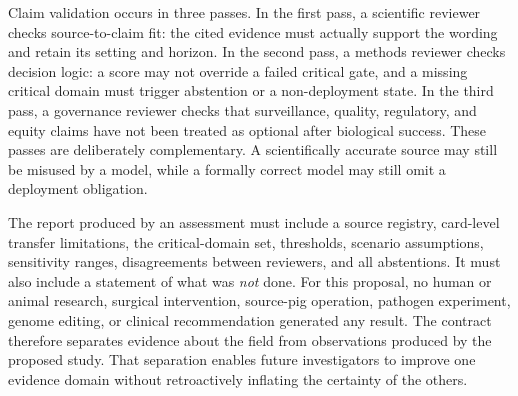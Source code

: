 \documentclass[conference]{IEEEtran}
\begin{document}
Claim validation occurs in three passes. In the first pass, a scientific reviewer checks source-to-claim fit: the cited evidence must actually support the wording and retain its setting and horizon. In the second pass, a methods reviewer checks decision logic: a score may not override a failed critical gate, and a missing critical domain must trigger abstention or a non-deployment state. In the third pass, a governance reviewer checks that surveillance, quality, regulatory, and equity claims have not been treated as optional after biological success. These passes are deliberately complementary. A scientifically accurate source may still be misused by a model, while a formally correct model may still omit a deployment obligation.

The report produced by an assessment must include a source registry, card-level transfer limitations, the critical-domain set, thresholds, scenario assumptions, sensitivity ranges, disagreements between reviewers, and all abstentions. It must also include a statement of what was \emph{not} done. For this proposal, no human or animal research, surgical intervention, source-pig operation, pathogen experiment, genome editing, or clinical recommendation generated any result. The contract therefore separates evidence about the field from observations produced by the proposed study. That separation enables future investigators to improve one evidence domain without retroactively inflating the certainty of the others.
\end{document}
